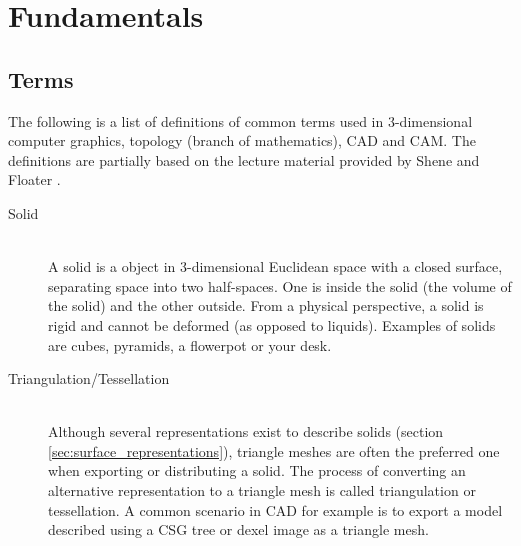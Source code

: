 \chapter{Fundamentals} %
\label{ch:fundamentals}

\section{Terms}
\label{sec:definitions}

The following is a list of definitions of common terms used in 3-dimensional computer graphics, topology (branch of mathematics), CAD and CAM. The definitions are partially based on the lecture material provided by Shene \cite{mesh_basics} and Floater \cite{mesh_lecture10}.

\begin{description}
	
	\item[Solid] \hfill \\
	A solid is a object in 3-dimensional Euclidean space with a closed surface, separating space into two half-spaces.
	One is inside the solid (the volume of the solid) and the other outside.
	From a physical perspective, a solid is rigid and cannot be deformed (as opposed to \eg liquids).
	Examples of solids are cubes, pyramids, a flowerpot or your desk.
	
	
	\item[Triangulation/Tessellation] \hfill \\
	Although several representations exist to describe solids (\cf section \ref{sec:surface_representations}), triangle meshes are often the preferred one when exporting or distributing a solid.
	The process of converting an alternative representation to a triangle mesh is called triangulation or tessellation.
	A common scenario in CAD for example is to export a model described using a CSG tree or dexel image as a triangle mesh.
	
	
	

\end{description}
